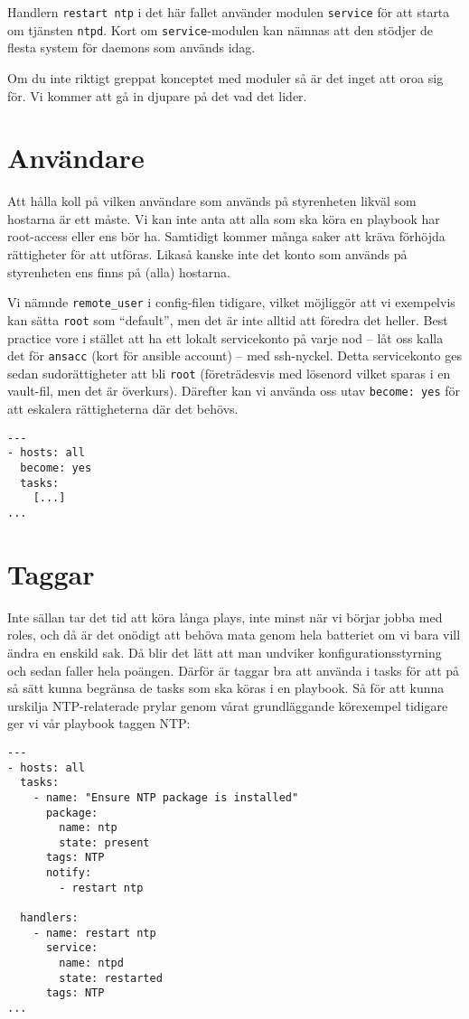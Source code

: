 Handlern \texttt{restart ntp} i det här fallet använder modulen \texttt{service} för att starta om tjänsten \texttt{ntpd}. Kort om \texttt{service}-modulen kan nämnas att den stödjer de flesta system för daemons som används idag.

Om du inte riktigt greppat konceptet med moduler så är det inget att oroa sig för. Vi kommer att gå in djupare på det vad det lider.

\section{Användare}
Att hålla koll på vilken användare som används på styrenheten likväl som hostarna är ett måste. Vi kan inte anta att
alla som ska köra en playbook har root-access eller ens bör ha. Samtidigt kommer många saker att kräva förhöjda 
rättigheter för att utföras. Likaså kanske inte det konto som används på styrenheten ens finns på (alla) hostarna.

Vi nämnde \texttt{remote\_user} i config-filen tidigare, vilket möjliggör att vi exempelvis kan sätta \texttt{root}
som ``default'', men det är inte alltid att föredra det heller. Best practice vore i stället att ha ett lokalt 
servicekonto på varje nod -- låt oss kalla det för \texttt{ansacc} (kort för ansible account) -- med ssh-nyckel.
Detta servicekonto ges sedan sudorättigheter att bli \texttt{root} (företrädesvis med lösenord vilket sparas i en
vault-fil, men det är överkurs). Därefter kan vi använda oss utav \texttt{become: yes} för att eskalera rättigheterna där det behövs.

\begin{verbatim}
---
- hosts: all
  become: yes
  tasks:
    [...]
...
\end{verbatim}

\section{Taggar}
Inte sällan tar det tid att köra långa plays, inte minst när vi börjar jobba med roles, och då är det onödigt att
behöva mata genom hela batteriet om vi bara vill ändra en enskild sak. Då blir det lätt att man undviker 
konfigurationsstyrning och sedan faller hela poängen. Därför är taggar bra att använda i tasks för att på så sätt
kunna begränsa de tasks som ska köras i en playbook. Så för att kunna urskilja NTP-relaterade prylar genom vårat 
grundläggande körexempel tidigare ger vi vår playbook taggen NTP:

\begin{verbatim}
---
- hosts: all
  tasks:
    - name: "Ensure NTP package is installed"
      package:
        name: ntp
        state: present
      tags: NTP
      notify:
        - restart ntp

  handlers:
    - name: restart ntp
      service:
        name: ntpd
        state: restarted
      tags: NTP
...
\end{verbatim}

